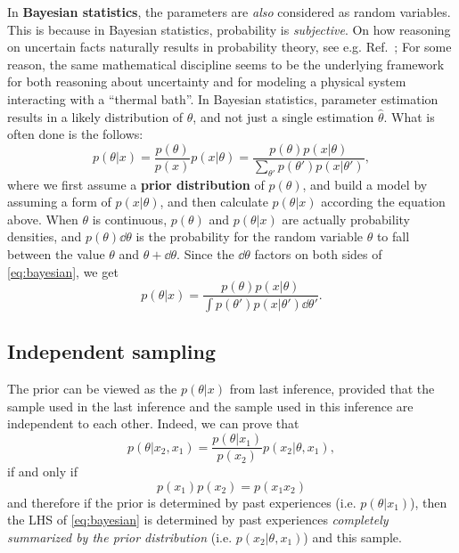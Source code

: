 \documentclass[hyperref, a4paper, 12pt]{report}
\newcommand*{\concept}[1]{{\textbf{#1}}}
\begin{document}
In \concept{Bayesian statistics}, the parameters are \emph{also} considered as random variables.
This is because in Bayesian statistics, probability is \emph{subjective}.
On how reasoning on uncertain facts naturally results in probability theory, see e.g. Ref.~\cite{jaynes2003probability};
For some reason, the same mathematical discipline seems to be the underlying framework for both reasoning about uncertainty and for modeling a physical system interacting with a ``thermal bath''.
In Bayesian statistics, parameter estimation results in a likely distribution of $\theta$,
and not just a single estimation $\hat{\theta}$.
What is often done is the follows:
\begin{equation}
    p(\theta | x) = \frac{p(\theta)}{p(x)} p(x | \theta) = \frac{p(\theta) p(x | \theta)}{\sum_{\theta'} p(\theta') p(x | \theta')},
    \label{eq:bayesian}
\end{equation}
where we first assume a \concept{prior distribution} of $p(\theta)$,
and build a model by assuming a form of $p(x | \theta)$,
and then calculate $p(\theta | x)$ according the equation above.
When $\theta$ is continuous, $p(\theta)$ and $p(\theta | x)$ are actually probability densities,
and $p(\theta) \dd{\theta}$ is the probability for the random variable $\theta$ to fall between the value $\theta$ and $\theta + \dd{\theta}$.
Since the $\dd{\theta}$ factors on both sides of \eqref{eq:bayesian}, we get 
\begin{equation}
    p(\theta | x) = \frac{p(\theta) p(x | \theta)}{\int p(\theta') p(x | \theta') \dd{\theta'}}.
\end{equation}

\subsection{Independent sampling}

The prior can be viewed as the $p(\theta | x)$ from last inference,
provided that the sample used in the last inference and the sample used in this inference
are independent to each other.
Indeed, we can prove that 
\begin{equation}
    p(\theta | x_2, x_1) = \frac{p(\theta | x_1)}{p(x_2)} p(x_2 | \theta, x_1),
    \label{eq:two-samples}
\end{equation}
if and only if 
\begin{equation}
    p(x_1) p(x_2) = p(x_1 x_2)
    \label{eq:independence}
\end{equation}
and therefore if the prior is determined by past experiences (i.e. $p(\theta | x_1)$),
then the LHS of \eqref{eq:bayesian} is determined by past experiences \emph{completely summarized by the prior distribution} (i.e. $p(x_2 | \theta, x_1)$) and this sample.
\end{document}

